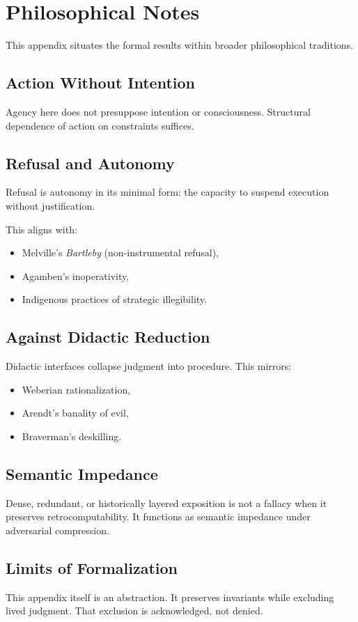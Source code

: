 \section{Philosophical Notes}

This appendix situates the formal results within broader philosophical traditions.

\subsection{Action Without Intention}

Agency here does not presuppose intention or consciousness. Structural dependence of action on constraints suffices.

\subsection{Refusal and Autonomy}

Refusal is autonomy in its minimal form: the capacity to suspend execution without justification.

This aligns with:
\begin{itemize}
  \item Melville's \emph{Bartleby} (non-instrumental refusal),
  \item Agamben's inoperativity,
  \item Indigenous practices of strategic illegibility.
\end{itemize}

\subsection{Against Didactic Reduction}

Didactic interfaces collapse judgment into procedure. This mirrors:
\begin{itemize}
  \item Weberian rationalization,
  \item Arendt's banality of evil,
  \item Braverman's deskilling.
\end{itemize}

\subsection{Semantic Impedance}

Dense, redundant, or historically layered exposition is not a fallacy when it preserves retrocomputability. It functions as semantic impedance under adversarial compression.

\subsection{Limits of Formalization}

This appendix itself is an abstraction. It preserves invariants while excluding lived judgment. That exclusion is acknowledged, not denied.

